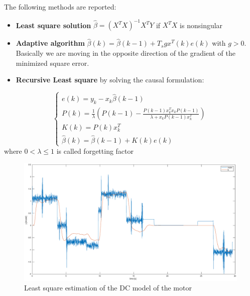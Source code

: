 \documentclass[a4paper,12pt]{article}
\begin{document}
\bigskip
\noindent The following methods are reported:
\begin{itemize}
    \item \textbf{Least square solution} $\hat{\beta} = (X^TX)^{-1}X^TY$ if $X^TX$ is nonsingular
    \item \textbf{Adaptive algorithm} $\hat{\beta}(k) = \hat{\beta}(k-1) + T_sgx^T(k)e(k)$ with $g > 0$. Basically we are moving in the opposite direction of the gradient of the minimized square error.
    \item \textbf{Recursive Least square} by solving the causal formulation:
\end{itemize}
\[
    \begin{cases}
        e(k) = y_k -x_k\hat{\beta}(k-1) \\
        P(k) = \frac{1}{\lambda} \left ( P(k-1) - \frac{P(k-1)x_k^Tx_kP(k-1)}{\lambda + x_kP(k-1)x_k^T}\right) \\ 
        K(k) = P(k)x_k^T \\
        \hat{\beta}(k) = \hat{\beta}(k-1) + K(k)e(k) 
    \end{cases}
\]
where $0 < \lambda \leq 1 $ is called forgetting factor

\begin{figure}[H]
    \begin{center}
        \includegraphics[scale=0.3]{images/ls.eps}
    \end{center}
    \caption{Least square estimation of the DC model of the motor}
    \label{fig:ls}
\end{figure}
\end{document}
